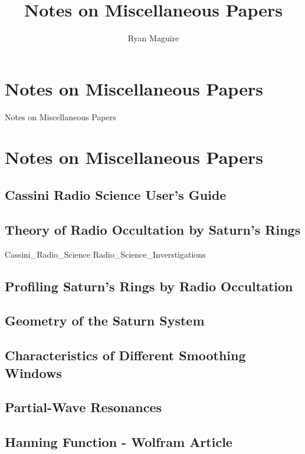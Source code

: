 \documentclass[crop=false,class=book,oneside]{standalone}
\begin{document}
    \ifx\ifresearchwhitinobservatory\undefined
        \title{Notes on Miscellaneous Papers}
        \author{Ryan Maguire}
        \date{\vspace{-5ex}}
        \maketitle
        \tableofcontents
        \chapter*{Notes on Miscellaneous Papers}
                        {Notes on Miscellaneous Papers}
        \setcounter{chapter}{1}
    \else
        \chapter{Notes on Miscellaneous Papers}
    \fi
    \section{Cassini Radio Science User's Guide}
        \label{sec:usrguide}

    \section{Theory of Radio Occultation by Saturn's Rings}
        {Cassini_Radio_Science}
        {Radio_Science_Inverstigations}
    \section{Profiling Saturn's Rings by Radio Occultation}
    \section{Geometry of the Saturn System}
    \section{Characteristics of Different Smoothing Windows}
    \section{Partial-Wave Resonances}
    \section{Hanning Function - Wolfram Article}
\end{document}
